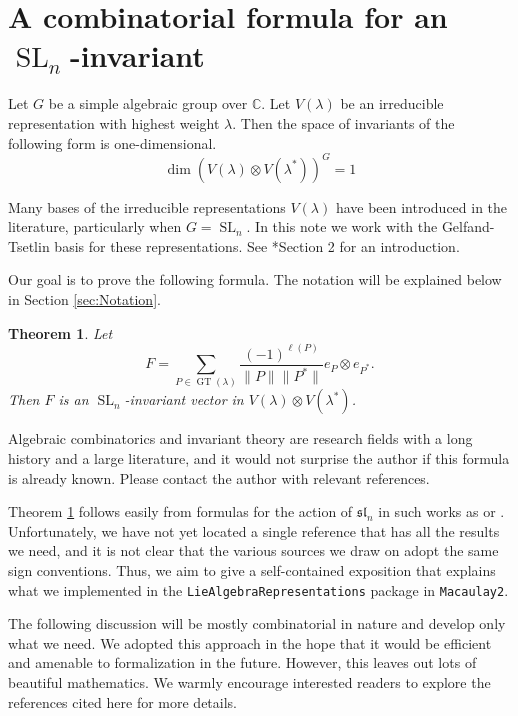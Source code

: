 \documentclass{amsart}[12pt]
\newtheorem{theorem}{Theorem}[section]
\theoremstyle{definition}
\numberwithin{equation}{section}
\newcommand{\SL}{\operatorname{SL}}
\newcommand{\GT}{\operatorname{GT}}
\begin{document}
\appendix

\section{A combinatorial formula for an $\SL_n$-invariant}

Let $G$ be a simple algebraic group over $\mathbb{C}$. Let $V(\lambda)$ be an
irreducible representation with highest weight $\lambda$. Then the
space of invariants of the following form is one-dimensional.
\[
\dim (V(\lambda) \otimes V(\lambda^{*}))^{G} = 1
\]


Many bases of the irreducible representations $V(\lambda)$ have been
introduced in the literature, particularly when $G = \SL_n$.  In this
note we work with the Gelfand-Tsetlin basis for these representations. See
\cite{Molev2006}*{Section 2} for an introduction.


Our goal is to prove the following formula. The notation will be
explained below in Section \ref{sec:Notation}. 


\begin{theorem} \label{theorem: invariant polynomial formula}
  Let
  \[
F = \sum_{P \in \GT(\lambda)} 
\frac{(-1)^{\ell(P)}}{\| P \| \| P^{*}\|} e_P \otimes e_{P^{*}}.
  \]
Then $F$ is an $\SL_n$-invariant vector in $V(\lambda) \otimes V(\lambda^{*})$.
\end{theorem}


Algebraic combinatorics and invariant theory are research fields with
a long history and a large literature, and it would not surprise the
author if this formula is already known. Please contact
the author with relevant references.


Theorem \ref{theorem: invariant polynomial formula} follows easily
from formulas for the action of $\mathfrak{sl}_n$ in such works as
\cite{Molev2006} or \cite{Z}. Unfortunately, we have not yet located a single
reference that has all the results we need, and it is not clear that
the various sources we draw on adopt the same sign conventions. Thus, we aim to give a
self-contained exposition that explains what we implemented in the
\texttt{LieAlgebraRepresentations} package in \texttt{Macaulay2}. 


The following discussion will be mostly
combinatorial in nature and develop only what we need. We adopted this
approach in the hope that it would be efficient and amenable to
formalization in the future. However, this 
leaves out lots of beautiful mathematics. We warmly encourage interested
readers to explore the references cited here for more details.
\end{document}
